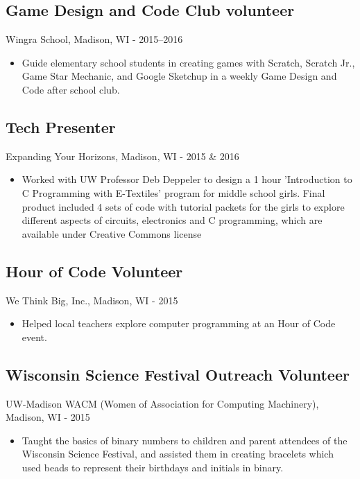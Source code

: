 \documentclass[../main.tex]{subfiles}
\begin{document}
\subsection*{Game Design and Code Club volunteer}
     Wingra School, Madison, WI - 2015--2016
\begin{itemize}
		\item{Guide elementary school students in creating games with Scratch, Scratch Jr., Game Star Mechanic, and Google Sketchup in a weekly Game Design and Code after school club.}
	\end{itemize}

\subsection*{Tech Presenter}
     Expanding Your Horizons, Madison, WI - 2015 \& 2016
\begin{itemize}
		\item{Worked with UW Professor Deb Deppeler to design a 1 hour 'Introduction to C Programming with E-Textiles' program for middle school girls. Final product included 4 sets of code with tutorial packets for the girls to explore different aspects of circuits, electronics and C programming, which are available under Creative Commons license}
	\end{itemize}


\subsection*{Hour of Code Volunteer}
     We Think Big, Inc., Madison, WI - 2015
\begin{itemize}
		\item{Helped local teachers explore computer programming at an Hour of Code event.}
	\end{itemize}

\subsection*{Wisconsin Science Festival Outreach Volunteer}
UW-Madison WACM (Women of Association for Computing Machinery), Madison, WI - 2015
\begin{itemize}
		\item{Taught the basics of binary numbers to children and parent attendees of the Wisconsin Science Festival, and assisted them in creating bracelets which used beads to represent their birthdays and initials in binary.}
	\end{itemize}
\end{document}
